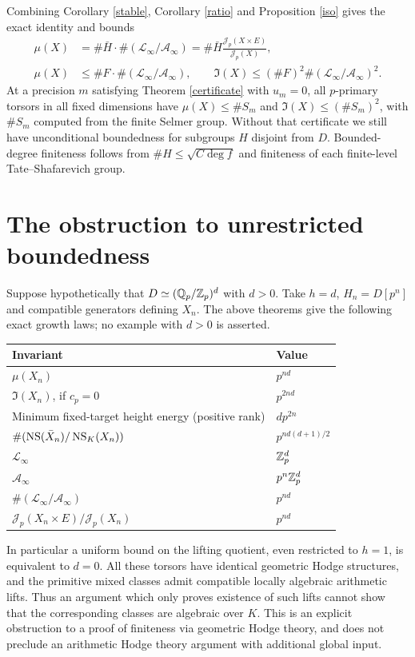 \documentclass[11pt,a4paper]{article}
\theoremstyle{remark}\newtheorem{remark}[theorem]{Remark}
\begin{document}
Combining Corollary \ref{stable}, Corollary \ref{ratio} and Proposition \ref{iso} gives the exact identity and bounds
\begin{align*}
 \mu(X)&=\#\bar H\cdot\#(\mathcal L_\infty/\mathcal A_\infty)
 =\#\bar H\frac{\mathcal J_p(X\times E)}{\mathcal J_p(X)},\\
 \mu(X)&\le\#F\cdot\#(\mathcal L_\infty/\mathcal A_\infty),\qquad
 \mathfrak I(X)\le(\#F)^2\#(\mathcal L_\infty/\mathcal A_\infty)^2.
\end{align*}
At a precision $m$ satisfying Theorem \ref{certificate} with $u_m=0$, all $p$-primary torsors in all fixed dimensions have $\mu(X)\le\#S_m$ and $\mathfrak I(X)\le(\#S_m)^2$, with $\#S_m$ computed from the finite Selmer group. Without that certificate we still have unconditional boundedness for subgroups $H$ disjoint from $D$. Bounded-degree finiteness follows from $\#H\le\sqrt{C\deg f}$ and finiteness of each finite-level Tate--Shafarevich group.

\section{The obstruction to unrestricted boundedness}
Suppose hypothetically that $D\simeq(\mathbb Q_p/\mathbb Z_p)^d$ with $d>0$. Take $h=d$, $H_n=D[p^n]$ and compatible generators defining $X_n$. The above theorems give the following exact growth laws; no example with $d>0$ is asserted.
\begin{center}\small
\begin{tabular}{@{}p{.60\linewidth}p{.30\linewidth}@{}}\toprule
Invariant & Value \\\midrule
$\mu(X_n)$ & $p^{nd}$\\
$\mathfrak I(X_n)$, if $c_p=0$ & $p^{2nd}$\\
Minimum fixed-target height energy (positive rank) & $dp^{2n}$\\
$\#(\operatorname{NS}(\bar X_n)/\operatorname{NS}_K(X_n))$ & $p^{nd(d+1)/2}$\\
$\mathcal L_\infty$ & $\mathbb Z_p^d$\\
$\mathcal A_\infty$ & $p^n\mathbb Z_p^d$\\
$\#(\mathcal L_\infty/\mathcal A_\infty)$ & $p^{nd}$\\
$\mathcal J_p(X_n\times E)/\mathcal J_p(X_n)$ & $p^{nd}$\\
\bottomrule\end{tabular}
\end{center}
In particular a uniform bound on the lifting quotient, even restricted to $h=1$, is equivalent to $d=0$. All these torsors have identical geometric Hodge structures, and the primitive mixed classes admit compatible locally algebraic arithmetic lifts. Thus an argument which only proves existence of such lifts cannot show that the corresponding classes are algebraic over $K$. This is an explicit obstruction to a proof of finiteness via geometric Hodge theory, and does not preclude an arithmetic Hodge theory argument with additional global input.
\end{document}
